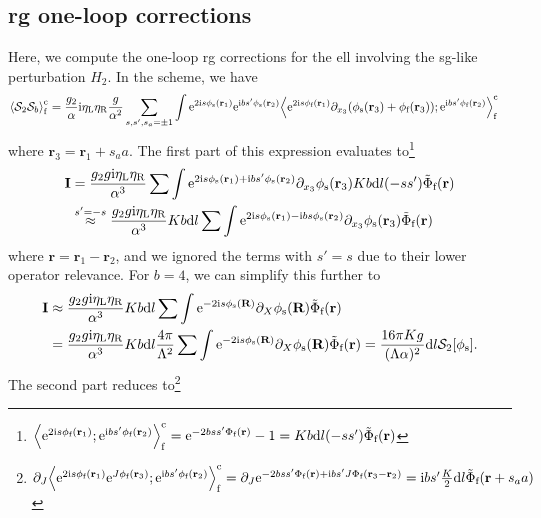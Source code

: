 \subsection{\tMs{} \texorpdfstring{\acrshort{rg}}{RG} one-loop corrections}\label{sec:app:ms_one_loop}
Here, we compute the one-loop \gls{rg} corrections for the \gls{ell} involving the \gls{sg}-like perturbation $H_2$.
In the \tms{} scheme, we have
\begin{align*}
\bra*{\sact_2 \sact_b}_\f^\c &= \frac{g_2}{\alpha} \i\eta_\L\eta_\R \frac{g}{\alpha^2} \sum_{s,s',s_a=\pm 1} \int \powe{2\i s\phi_\s(\textbf{r}_1)} \powe{\i bs' \phi_\s(\textbf{r}_2)} \bra*{\powe{2\i s\phi_\f(\textbf{r}_1)} \partial_{x_3} \kla*{\phi_\s(\textbf{r}_3) + \phi_\f(\textbf{r}_3)} ;\powe{\i bs' \phi_\f(\textbf{r}_2)}}_\f^\c
\end{align*}
where $\textbf{r}_3= \textbf{r}_1 + s_aa$.
The first part of this expression evaluates to\footnote{$\bra*{\powe{2\i s\phi_\f(\textbf{r}_1)} ;\powe{\i bs' \phi_\f(\textbf{r}_2)}}_\f^\c = \powe{-2bss' \Phi_\f(\textbf{r})} - 1 = Kb \d l (-ss') \tilde{\Phi}_\f(\textbf{r})$}
\begin{align*}
\textbf{I} &= \frac{g_2g \i\eta_\L\eta_\R}{\alpha^3} \sum \int \powe{2\i s\phi_\s(\textbf{r}_1) + \i bs' \phi_\s(\textbf{r}_2)} \partial_{x_3} \phi_\s(\textbf{r}_3) Kb \d l (-ss') \tilde{\Phi}_\f(\textbf{r})\\
&\overset{s'=-s}{\approx} \frac{g_2g \i\eta_\L\eta_\R}{\alpha^3} Kb \d l \sum \int \powe{2\i s\phi_\s(\textbf{r}_1) - \i bs \phi_\s(\textbf{r}_2)} \partial_{x_3} \phi_\s(\textbf{r}_3) \tilde{\Phi}_\f(\textbf{r})
\end{align*}
where $\textbf{r} = \textbf{r}_1 - \textbf{r}_2$, and we ignored the terms with $s'=s$ due to their lower operator relevance.
For $b=4$, we can simplify this further to
\begin{align*}
\textbf{I} &\approx \frac{g_2g \i\eta_\L\eta_\R}{\alpha^3} Kb \d l \sum \int \powe{-2\i s\phi_\s(\textbf{R})} \partial_{X} \phi_\s(\textbf{R}) \tilde{\Phi}_\f(\textbf{r}) \\
&= \frac{g_2g \i\eta_\L\eta_\R}{\alpha^3} Kb \d l \frac{4\pi}{\Lambda^2} \sum \int \powe{-2\i s\phi_\s(\textbf{R})} \partial_{X} \phi_\s(\textbf{R}) \tilde{\Phi}_\f(\textbf{r}) = \frac{16\pi K g}{(\Lambda\alpha)^2} \d l \sact_{2}[\phi_\s].
\end{align*}
The second part reduces to\footnote{$\partial_J \bra*{\powe{2\i s\phi_\f(\textbf{r}_1)} \powe{J\phi_\f(\textbf{r}_3)} ;\powe{\i bs' \phi_\f(\textbf{r}_2)}}_\f^\c = \partial_J \powe{-2bss' \Phi_\f(\textbf{r}) + \i bs'J\Phi_\f(\textbf{r}_3 - \textbf{r}_2)} = \i bs' \frac{K}{2} \d l \tilde{\Phi}_\f(\textbf{r} + s_aa)$}
